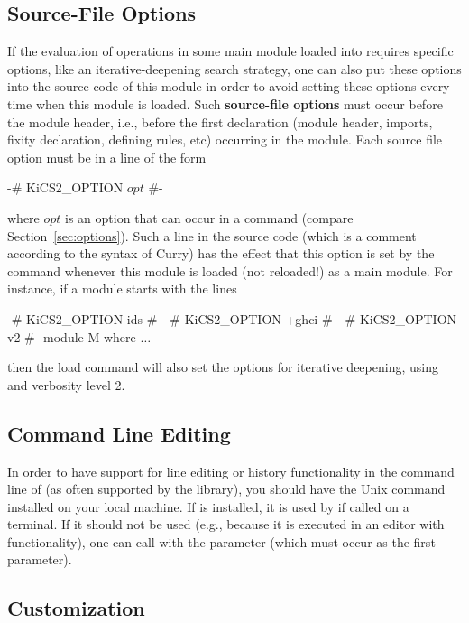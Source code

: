 \subsection{Source-File Options}

If the evaluation of operations in some main module loaded into
\CYS requires specific options, like an iterative-deepening
search strategy, one can also put these options into the source
code of this module in order to avoid setting these options
every time when this module is loaded.
Such
{\bf source-file options}
must occur before the module header, i.e., before the first declaration
(module header, imports, fixity declaration, defining rules, etc)
occurring in the module.
Each source file option must be in a line of the form
\begin{curry}
{-# KiCS2_OPTION $opt$ #-}
\end{curry}
where $opt$ is an option that can occur in a  command
(compare Section~\ref{sec:options}).
Such a line in the source code (which is a comment according to
the syntax of Curry)
has the effect that this option is set by the \CYS command
 whenever this module is loaded (not reloaded!)
as a main module. For instance, if a module starts with the
lines
\begin{curry}
{-# KiCS2_OPTION ids #-}
{-# KiCS2_OPTION +ghci #-}
{-# KiCS2_OPTION v2 #-}
module M where
$\ldots$
\end{curry}
then the load command  will also
set the options for iterative deepening, using 
and verbosity level 2.


\subsection{Command Line Editing}

In order to have support for line editing or history functionality
in the command line of \CYS (as often supported by the 
library), you should have the Unix command  installed
on your local machine.
If  is installed, it is used by \CYS if called on a terminal.
If it should not be used (e.g., because it is executed
in an editor with  functionality), one can
call \CYS with the parameter 
(which must occur as the first parameter).


\subsection{Customization}
\label{sec-customization}

